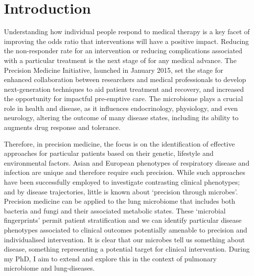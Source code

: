 \chapter*{Introduction}

Understanding how individual people respond to medical therapy is a key facet of improving the odds ratio that interventions will have a positive impact. Reducing the non-responder rate for an intervention or reducing complications associated with a particular treatment is the next stage of for any medical advance. The Precision Medicine Initiative, launched in January 2015, set the stage for enhanced collaboration between researchers and medical professionals to develop next-generation techniques to aid patient treatment and recovery, and increased the opportunity for impactful pre-emptive care. The microbiome plays a crucial role in health and disease, as it influences endocrinology, physiology, and even neurology, altering the outcome of many disease states, including its ability to augments drug response and tolerance.

Therefore, in precision medicine, the focus is on the identification of effective approaches for particular patients based on their genetic, lifestyle and environmental factors. Asian and European phenotypes of respiratory disease and infection are unique and therefore require such precision. While such approaches have been successfully employed to investigate contrasting clinical phenotypes; and by disease trajectories, little is known about `precision through microbes'. Precision medicine can be applied to the lung microbiome that includes both bacteria and fungi and their associated metabolic states. These `microbial fingerprints' permit patient stratification and we can identify particular disease phenotypes associated to clinical outcomes potentially amenable to precision and individualised intervention. It is clear that our microbes tell us something about disease, something representing a potential target for clinical intervention. During my PhD, I aim to extend and explore this in the context of pulmonary microbiome and lung-diseases. 

